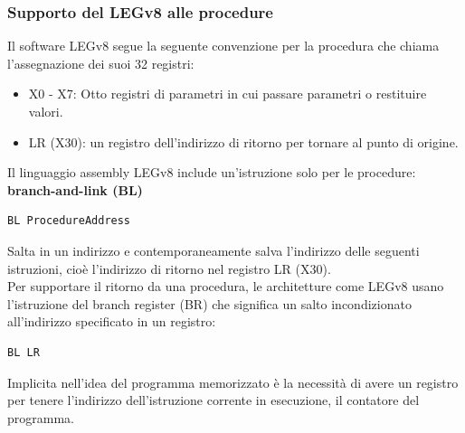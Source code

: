 \documentclass[12pt,a4paper]{article}
\begin{document}
\subsubsection{Supporto del LEGv8 alle procedure}
Il software LEGv8 segue la seguente convenzione per la procedura che chiama l'assegnazione dei suoi 32 registri:
\begin{itemize}
\item X0 - X7: Otto registri di parametri in cui passare parametri o restituire valori.
\item LR (X30): un registro dell'indirizzo di ritorno per tornare al punto di origine.
\end{itemize}
Il linguaggio assembly LEGv8 include un'istruzione solo per le procedure: \textbf{branch-and-link (BL)} 
\begin{center}
\begin{minipage}{.4\linewidth}
\begin{verbatim}
BL ProcedureAddress
\end{verbatim}
\end{minipage}
\end{center}
Salta in un indirizzo e contemporaneamente salva l'indirizzo delle seguenti istruzioni, cioè l'indirizzo di ritorno nel registro LR (X30).\\
Per supportare il ritorno da una procedura, le architetture come LEGv8 usano l'istruzione del branch register (BR) che significa un salto incondizionato all'indirizzo specificato in un registro:
\begin{center}
\begin{minipage}{.4\linewidth}
\begin{verbatim}
BL LR
\end{verbatim}
\end{minipage}
\end{center}
Implicita nell'idea del programma memorizzato è la necessità di avere un registro per tenere l'indirizzo dell'istruzione corrente in esecuzione, il contatore del programma.
\end{document}
